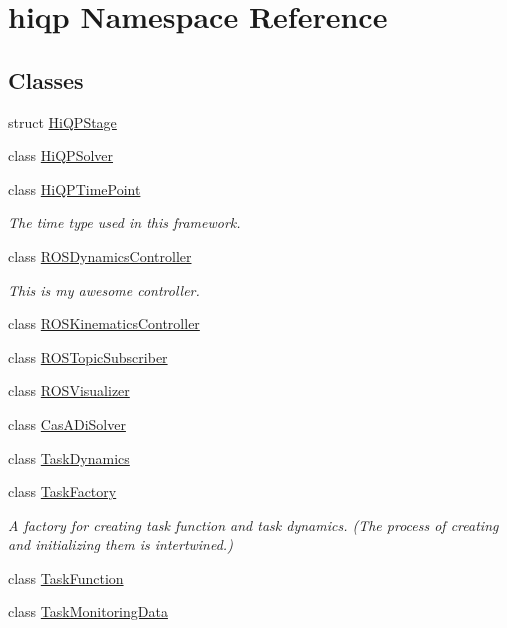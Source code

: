 \hypertarget{namespacehiqp}{\section{hiqp Namespace Reference}
\label{namespacehiqp}
}
\subsection*{Classes}
\begin{DoxyCompactItemize}
\item 
struct \hyperlink{structhiqp_1_1HiQPStage}{Hi\-Q\-P\-Stage}
\item 
class \hyperlink{classhiqp_1_1HiQPSolver}{Hi\-Q\-P\-Solver}
\item 
class \hyperlink{classhiqp_1_1HiQPTimePoint}{Hi\-Q\-P\-Time\-Point}
\begin{DoxyCompactList}\small\item\em The time type used in this framework. \end{DoxyCompactList}\item 
class \hyperlink{classhiqp_1_1ROSDynamicsController}{R\-O\-S\-Dynamics\-Controller}
\begin{DoxyCompactList}\small\item\em This is my awesome controller. \end{DoxyCompactList}\item 
class \hyperlink{classhiqp_1_1ROSKinematicsController}{R\-O\-S\-Kinematics\-Controller}
\item 
class \hyperlink{classhiqp_1_1ROSTopicSubscriber}{R\-O\-S\-Topic\-Subscriber}
\item 
class \hyperlink{classhiqp_1_1ROSVisualizer}{R\-O\-S\-Visualizer}
\item 
class \hyperlink{classhiqp_1_1CasADiSolver}{Cas\-A\-Di\-Solver}
\item 
class \hyperlink{classhiqp_1_1TaskDynamics}{Task\-Dynamics}
\item 
class \hyperlink{classhiqp_1_1TaskFactory}{Task\-Factory}
\begin{DoxyCompactList}\small\item\em A factory for creating task function and task dynamics. (The process of creating and initializing them is intertwined.) \end{DoxyCompactList}\item 
class \hyperlink{classhiqp_1_1TaskFunction}{Task\-Function}
\item 
class \hyperlink{classhiqp_1_1TaskMonitoringData}{Task\-Monitoring\-Data}

\end{DoxyCompactItemize}
